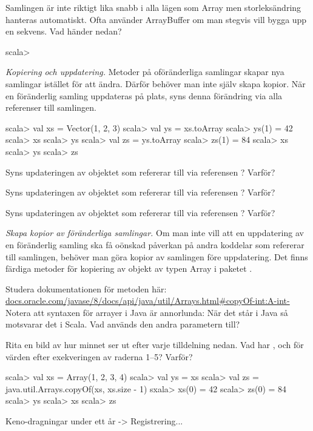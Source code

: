 \Subtask Samlingen  är inte riktigt lika snabb i alla lägen som Array men storleksändring hanteras automatiskt. Ofta använder ArrayBuffer om man stegvis vill bygga upp en sekvens. Vad händer nedan?
\begin{REPL}
scala> 

\end{REPL}


\Task \emph{Kopiering och uppdatering.} Metoder på oföränderliga samlingar skapar nya samlingar istället för att ändra. Därför behöver man inte själv skapa kopior. När en föränderlig samling uppdateras på plats, syns denna förändring via alla referenser till samlingen.

\begin{REPL}
scala> val xs = Vector(1, 2, 3)
scala> val ys = xs.toArray
scala> ys(1) = 42
scala> xs
scala> ys
scala> val zs = ys.toArray
scala> zs(1) = 84
scala> xs
scala> ys
scala> zs
\end{REPL}

\Subtask Syns updateringen av objektet som  refererar till via referensen ? Varför?

\Subtask Syns updateringen av objektet som  refererar till via referensen ? Varför? 

\Subtask Syns updateringen av objektet som  refererar till via referensen ? Varför?

\Task \emph{Skapa kopior av föränderliga samlingar.} Om man inte vill att en uppdatering av en föränderlig samling ska få oönskad påverkan på andra koddelar som refererar till samlingen, behöver man göra kopior av samlingen före uppdatering. Det finns färdiga metoder för kopiering av objekt av typen Array i paketet . 

\Subtask\Pen Studera dokumentationen för metoden  här:\\ \href{https://docs.oracle.com/javase/8/docs/api/java/util/Arrays.html\#copyOf-int:A-int-}{docs.oracle.com/javase/8/docs/api/java/util/Arrays.html\#copyOf-int:A-int-} \\
Notera att syntaxen för arrayer i Java är annorlunda: När det står  i Java så motsvarar det  i Scala. Vad används den andra parametern till?

\Subtask\Pen Rita en bild av hur minnet ser ut efter varje tilldelning nedan. Vad har ,  och  för värden efter exekveringen av raderna 1--5? Varför? 
\begin{REPL}
scala> val xs = Array(1, 2, 3, 4)
scala> val ys = xs
scala> val zs = java.util.Arrays.copyOf(xs, xs.size - 1)
sxala> xs(0) = 42
scala> zs(0) = 84
scala> ys
scala> xs
scala> zs
\end{REPL}







\Task Keno-dragningar under ett år -> Registrering...

\ExtraTasks %

\Task 

\AdvancedTasks %

\Task     
    
